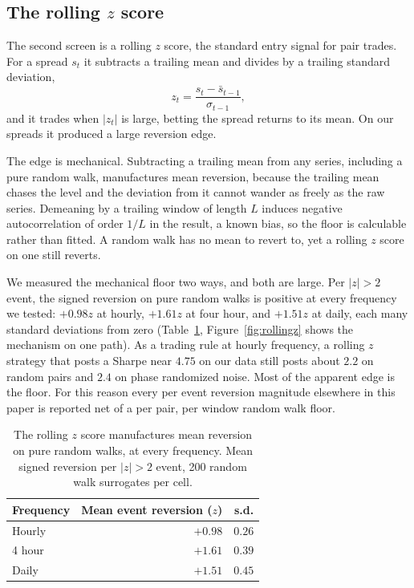 \documentclass[11pt]{article}
\begin{document}
\subsection{The rolling $z$ score}
\label{sec:rollingz}

The second screen is a rolling $z$ score, the standard entry signal for pair trades. For a
spread $s_t$ it subtracts a trailing mean and divides by a trailing standard deviation,
\[
z_t = \frac{s_t - \bar{s}_{t-1}}{\sigma_{t-1}},
\]
and it trades when $|z_t|$ is large, betting the spread returns to its mean. On our spreads it
produced a large reversion edge.

The edge is mechanical. Subtracting a trailing mean from any series, including a pure random
walk, manufactures mean reversion, because the trailing mean chases the level and the deviation
from it cannot wander as freely as the raw series. Demeaning by a trailing window of length $L$
induces negative autocorrelation of order $1/L$ in the result, a known bias, so the floor is
calculable rather than fitted. A random walk has no mean to revert to, yet
a rolling $z$ score on one still reverts.

We measured the mechanical floor two ways, and both are large. Per $|z|>2$ event, the signed
reversion on pure random walks is positive at every frequency we tested: $+0.98z$ at hourly,
$+1.61z$ at four hour, and $+1.51z$ at daily, each many standard deviations from zero
(Table~\ref{tab:rollingz}, Figure~\ref{fig:rollingz} shows the mechanism on one path). As a trading rule at hourly frequency, a rolling $z$ strategy that
posts a Sharpe near $4.75$ on our data still posts about $2.2$ on random pairs and $2.4$ on
phase randomized noise. Most of the apparent edge is the floor. For this reason every per event
reversion magnitude elsewhere in this paper is reported net of a per pair, per window
random walk floor.

\begin{table}[h]
\centering
\caption{The rolling $z$ score manufactures mean reversion on pure random walks, at every
frequency. Mean signed reversion per $|z|>2$ event, 200 random walk surrogates per cell.}
\label{tab:rollingz}
\begin{tabular}{lrr}
\toprule
Frequency & Mean event reversion ($z$) & s.d. \\
\midrule
Hourly & $+0.98$ & $0.26$ \\
4 hour & $+1.61$ & $0.39$ \\
Daily  & $+1.51$ & $0.45$ \\
\bottomrule
\end{tabular}
\end{table}
\end{document}
